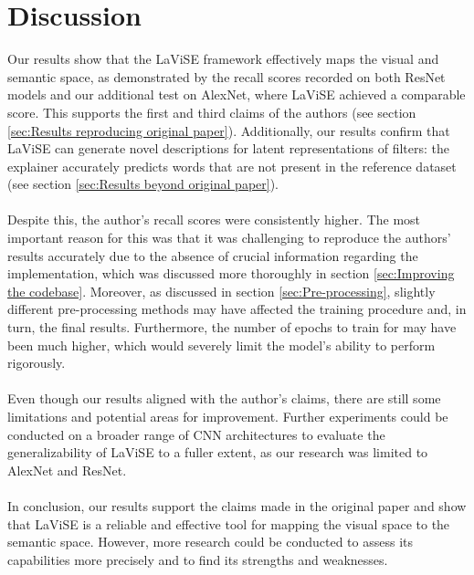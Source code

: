 \section{Discussion} \label{sec:Discussion}
Our results show that the LaViSE framework effectively maps the visual and semantic space, as demonstrated by the recall scores recorded on both ResNet models and our additional test on AlexNet, where LaViSE achieved a comparable score. This supports the first and third claims of the authors (see section \ref{sec:Results reproducing original paper}). Additionally, our results confirm that LaViSE can generate novel descriptions for latent representations of filters: the explainer accurately predicts words that are not present in the reference dataset (see section \ref{sec:Results beyond original paper}).
\\\\
Despite this, the author's recall scores were consistently higher. The most important reason for this was that it was challenging to reproduce the authors' results accurately due to the absence of crucial information regarding the implementation, which was discussed more thoroughly in section \ref{sec:Improving the codebase}. Moreover, as discussed in section \ref{sec:Pre-processing}, slightly different pre-processing methods may have affected the training procedure and, in turn, the final results. Furthermore, the number of epochs to train for may have been much higher, which would severely limit the model's ability to perform rigorously.
\\\\
Even though our results aligned with the author's claims, there are still some limitations and potential areas for improvement. Further experiments could be conducted on a broader range of CNN architectures to evaluate the generalizability of LaViSE to a fuller extent, as our research was limited to AlexNet and ResNet.
\\\\
In conclusion, our results support the claims made in the original paper and show that LaViSE is a reliable and effective tool for mapping the visual space to the semantic space. However, more research could be conducted to assess its capabilities more precisely and to find its strengths and weaknesses.

